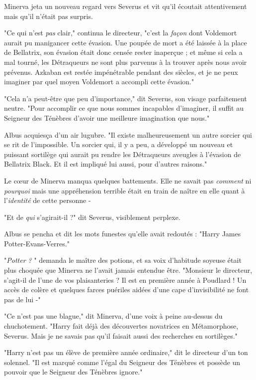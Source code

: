 Minerva jeta un nouveau regard vers Severus et vit qu'il écoutait attentivement mais qu'il n'était pas surpris.

"Ce qui n'est \emph{pas}  clair," continua le directeur, "c'est la \emph{façon}  dont Voldemort aurait pu manigancer cette évasion. Une poupée de mort a été laissée à la place de Bellatrix, son évasion était donc censée rester inaperçue ; et même si cela a mal tourné, les Détraqueurs ne sont plus parvenus à la trouver après nous avoir prévenus. Azkaban est restée impénétrable pendant des siècles, et je ne peux imaginer par quel moyen Voldemort a accompli cette évasion."

"Cela n'a peut-être que peu d'importance," dit Severus, son visage parfaitement neutre. "Pour accomplir ce que nous sommes incapables d'imaginer, il suffit au Seigneur des Ténèbres d'avoir une meilleure imagination que nous."

Albus acquiesça d'un air lugubre. "Il existe malheureusement un autre sorcier qui se rit de l'impossible. Un sorcier qui, il y a peu, a développé un nouveau et puissant sortilège qui aurait pu rendre les Détraqueurs aveugles à l'évasion de Bellatrix Black. Et il est impliqué lui aussi, pour d'autres raisons."

Le cœur de Minerva manqua quelques battements. Elle ne savait pas \emph{comment}  ni \emph{pourquoi}  mais une appréhension terrible était en train de naître en elle quant à l'\emph{identité}  de cette personne -

"Et de \emph{qui}  s'agirait-il ?" dit Severus, visiblement perplexe.

Albus se pencha et dit les mots funestes qu'elle avait redoutés : "Harry James Potter-Evans-Verres."

"\emph{Potter ?} " demanda le maître des potions, et sa voix d'habitude soyeuse était plus choquée que Minerva ne l'avait jamais entendue être. "Monsieur le directeur, s'agit-il de l'une de vos plaisanteries ? Il est en première année à Poudlard ! Un accès de colère et quelques farces puériles aidées d'une cape d'invisibilité ne font pas de lui -"

"Ce n'est pas une blague," dit Minerva, d'une voix à peine au-dessus du chuchotement. "Harry fait déjà des découvertes novatrices en Métamorphose, Severus. Mais je ne savais pas qu'il faisait aussi des recherches en sortilèges."

"Harry n'est pas un élève de première année ordinaire," dit le directeur d'un ton solennel. "Il est marqué comme l'égal du Seigneur des Ténèbres et possède un pouvoir que le Seigneur des Ténèbres ignore."

